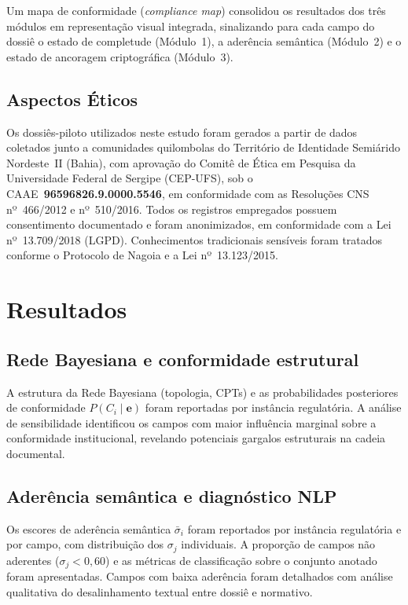 \documentclass[preprint,12pt,authoryear]{elsarticle}
\begin{document}
Um mapa de conformidade (\textit{compliance map}) consolidou os resultados dos três módulos em representação visual integrada, sinalizando para cada campo do dossiê o estado de completude (Módulo~1), a aderência semântica (Módulo~2) e o estado de ancoragem criptográfica (Módulo~3).

\subsection{Aspectos Éticos}

Os dossiês-piloto utilizados neste estudo foram gerados a partir de dados coletados junto a comunidades quilombolas do Território de Identidade Semiárido Nordeste~II (Bahia), com aprovação do Comitê de Ética em Pesquisa da Universidade Federal de Sergipe (CEP-UFS), sob o CAAE~\textbf{96596826.9.0000.5546}, em conformidade com as Resoluções CNS nº~466/2012 e nº~510/2016. Todos os registros empregados possuem consentimento documentado e foram anonimizados, em conformidade com a Lei nº~13.709/2018 (LGPD). Conhecimentos tradicionais sensíveis foram tratados conforme o Protocolo de Nagoia e a Lei nº~13.123/2015.


\section{Resultados}

\subsection{Rede Bayesiana e conformidade estrutural}
\label{subsec:res_bayes_cap5}

A estrutura da Rede Bayesiana (topologia, CPTs) e as probabilidades posteriores de conformidade $P(C_i \mid \mathbf{e})$ foram reportadas por instância regulatória. A análise de sensibilidade identificou os campos com maior influência marginal sobre a conformidade institucional, revelando potenciais gargalos estruturais na cadeia documental.

\subsection{Aderência semântica e diagnóstico NLP}
\label{subsec:res_sbert_cap5}

Os escores de aderência semântica $\bar{\sigma}_i$ foram reportados por instância regulatória e por campo, com distribuição dos $\sigma_j$ individuais. A proporção de campos não aderentes ($\sigma_j < 0{,}60$) e as métricas de classificação sobre o conjunto anotado foram apresentadas. Campos com baixa aderência foram detalhados com análise qualitativa do desalinhamento textual entre dossiê e normativo.
\end{document}
